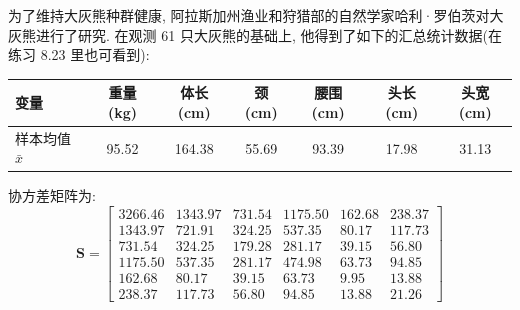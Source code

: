 \quad 为了维持大灰熊种群健康, 阿拉斯加州渔业和狩猎部的自然学家哈利·罗伯茨对大灰熊进行了研究. 在观测 61 只大灰熊的基础上, 他得到了如下的汇总统计数据(在练习 8.23 里也可看到):

\begin{center}
\begin{tabular}{lcccccc}
\toprule
变量 & 重量(kg) & 体长(cm) & 颈(cm) & 腰围(cm) & 头长(cm) & 头宽(cm)\\
\midrule
样本均值 $\bar{x}$ & 95.52 & 164.38 & 55.69 & 93.39 & 17.98 & 31.13\\
\bottomrule
\end{tabular}
\end{center}

协方差矩阵为:
\[
\mathbf{S}=\begin{bmatrix}
3266.46&1343.97&731.54&1175.50&162.68&238.37\\
1343.97&721.91&324.25&537.35&80.17&117.73\\
731.54&324.25&179.28&281.17&39.15&56.80\\
1175.50&537.35&281.17&474.98&63.73&94.85\\
162.68&80.17&39.15&63.73&9.95&13.88\\
238.37&117.73&56.80&94.85&13.88&21.26
\end{bmatrix}
\]

